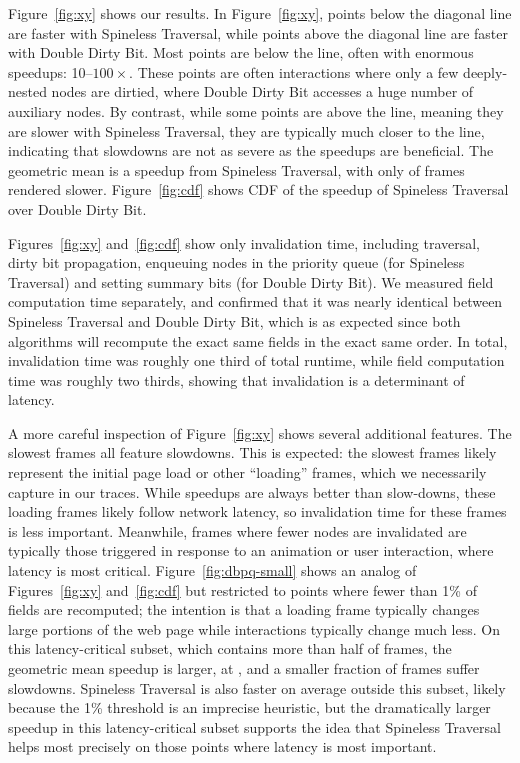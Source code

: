 Figure~\ref{fig:xy}
  shows our results.
In Figure~\ref{fig:xy}, points below the diagonal line
  are faster with Spineless Traversal,
  while points above the diagonal line
  are faster with Double Dirty Bit.
Most points are below the line,
  often with enormous speedups: 10--$100\times$.
These points are often interactions
  where only a few deeply-nested nodes are dirtied,
  where Double Dirty Bit accesses a huge number
  of auxiliary nodes.
By contrast, while some points are above the line,
  meaning they are slower with Spineless Traversal,
  they are typically much closer to the line,
  indicating that slowdowns are not as severe
  as the speedups are beneficial.
The geometric mean is a \MeanSpeedup speedup
  from Spineless Traversal,
  with only \PctSlower of frames rendered slower.
Figure~\ref{fig:cdf} shows CDF of the speedup
  of Spineless Traversal over Double Dirty Bit.

Figures~\ref{fig:xy} and~\ref{fig:cdf} show
  only invalidation time,
  including traversal, dirty bit propagation,
  enqueuing nodes in the priority queue (for Spineless Traversal)
  and setting summary bits (for Double Dirty Bit).
We measured field computation time separately,
  and confirmed that it was nearly identical
  between Spineless Traversal and Double Dirty Bit,
  which is as expected since both algorithms will
  recompute the exact same fields in the exact same order.
In total, invalidation time was roughly one third of total runtime,
  while field computation time was roughly two thirds,
  showing that invalidation is a determinant of latency.

A more careful inspection of Figure~\ref{fig:xy} shows
  several additional features.
The slowest frames all feature slowdowns.
This is expected: the slowest frames likely represent
  the initial page load or other ``loading'' frames,
  which we necessarily capture in our traces.
While speedups are always better than slow-downs,
  these loading frames likely follow network latency,
  so invalidation time for these frames is less important.
Meanwhile, frames where fewer nodes are invalidated
  are typically those triggered in response to
  an animation or user interaction,
  where latency is most critical.
Figure~\ref{fig:dbpq-small} shows an analog of
  Figures~\ref{fig:xy} and~\ref{fig:cdf}
  but restricted to points where fewer than 1\% of fields
  are recomputed;
  the intention is that a loading frame typically changes
  large portions of the web page
  while interactions typically change much less.
On this latency-critical subset,
  which contains more than half of frames,
  the geometric mean speedup is larger,
  at \MeanSpeedupSmall,
  and a smaller fraction of frames suffer slowdowns.
Spineless Traversal is also faster on average outside this subset,
  likely because the 1\% threshold is an imprecise heuristic,
  but the dramatically larger speedup in this latency-critical subset
  supports the idea that Spineless Traversal helps most
  precisely on those points where latency is most important.

